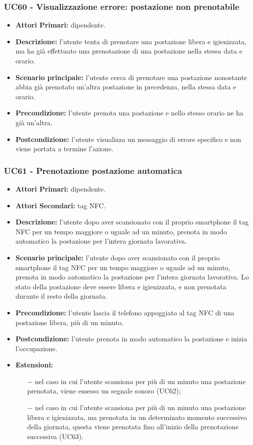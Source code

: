 \subsubsection{ UC60 - Visualizzazione errore: postazione non prenotabile }
\begin{itemize}
	\item\textbf{Attori Primari:} dipendente.
	\item\textbf{Descrizione:} l’utente tenta di prenotare una postazione libera e igienizzata, ma ha già effettuato una prenotazione di una postazione nella stessa data e orario.
	\item\textbf{Scenario principale:} l'utente cerca di prenotare una postazione nonostante abbia già prenotato un'altra postazione in precedenza, nella stessa data e orario.
	\item\textbf{Precondizione:} l'utente prenota una postazione e nello stesso orario ne ha già un'altra.
	\item\textbf{Postcondizione:} l’utente visualizza un messaggio di errore specifico e non viene portata a termine l’azione.
\end{itemize}

\subsubsection{ UC61 - Prenotazione postazione automatica}
\begin{itemize}
	\item\textbf{Attori Primari:} dipendente.
	\item\textbf{Attori Secondari:} tag NFC.
	\item\textbf{Descrizione:} l’utente dopo aver scansionato con il proprio smartphone il tag NFC per un tempo maggiore o uguale ad un minuto, prenota in modo automatico la postazione per l'intera giornata lavorativa. 
	\item\textbf{Scenario principale:} l’utente dopo aver scansionato con il proprio smartphone il tag NFC per un tempo maggiore o uguale ad un minuto, prenota in modo automatico la postazione per l'intera giornata lavorativa. Lo stato della postazione deve essere libera e igienizzata, e non prenotata durante il resto della giornata.
	\item\textbf{Precondizione:} l'utente lascia il telefono appoggiato al tag NFC di una postazione libera, più di un minuto.
	\item\textbf{Postcondizione:} l'utente prenota in modo automatico la postazione e inizia l'occupazione.
	\item\textbf{Estensioni:}
	\begin{itemize}
		\item[$-$] nel caso in cui l'utente scansiona per più di un minuto una postazione prenotata, viene emesso un segnale sonoro (UC62);
		\item[$-$] nel caso in cui l'utente scansiona per più di un minuto una postazione libera e igienizzata, ma prenotata in un determinato momento successivo della giornata, questa viene prenotata fino all'inizio della prenotazione successiva (UC63).
	\end{itemize}
\end{itemize}
